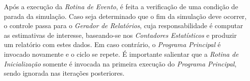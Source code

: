 Após a execução da \textit{Rotina de Evento}, é feita a verificação de uma
condição de parada da simulação. Caso seja determinado que o fim da simulação
deve ocorrer, o controle passa para o \textit{Gerador de Relatórios}, cuja
responsabilidade é computar as estimativas de interesse, baseando-se nos
\textit{Contadores Estatísticos} e produzir um relatório com estes dados. Em
caso contrário, o \textit{Programa Principal} é invocado novamente e o ciclo se
repete. É importante salientar que a \textit{Rotina de Inicialização} somente é
invocada na primeira execução do \textit{Programa Principal}, sendo ignorada nas
iterações posteriores.
